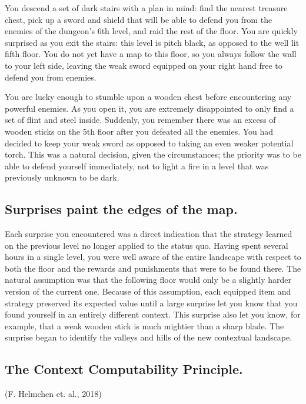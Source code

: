 \documentclass[]{article}
\begin{document}
You descend a set of dark stairs with a plan in mind: find the nearest treasure chest, pick up a sword and shield that will be able to defend you from the enemies of the dungeon's 6th level, and raid the rest of the floor.  You are quickly surprised as you exit the stairs: this level is pitch black, as opposed to the well lit fifth floor.  You do not yet have a map to this floor, so you always follow the wall to your left side, leaving the weak sword equipped on your right hand free to defend you from enemies.

You are lucky enough to stumble upon a wooden chest before encountering any powerful enemies.  As you open it, you are extremely disappointed to only find a set of flint and steel inside.  Suddenly, you remember there was an excess of wooden sticks on the 5th floor after you defeated all the enemies.  You had decided to keep your weak sword as opposed to taking an even weaker potential torch.  This was a natural decision, given the circumstances; the priority was to be able to defend yourself immediately, not to light a fire in a level that was previously unknown to be dark.

\subsection{Surprises paint the edges of the map.}

Each surprise you encountered was a direct indication that the strategy learned on the previous level no longer applied to the status quo.  Having spent several hours in a single level, you were well aware of the entire landscape with respect to both the floor and the rewards and punishments that were to be found there.  The natural assumption was that the following floor would only be a slightly harder version of the current one.  Because of this assumption, each equipped item and strategy preserved its expected value until a large surprise let you know that you found yourself in an entirely different context.  This surprise also let you know, for example, that a weak wooden stick is much mightier than a sharp blade.  The surprise began to identify the valleys and hills of the new contextual landscape.

\subsection{The Context Computability Principle.}

(F. Helmchen et. al., 2018)
\end{document}

